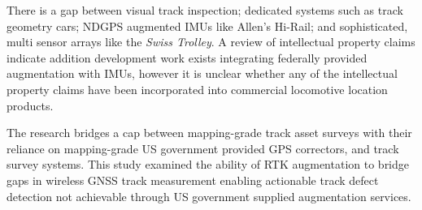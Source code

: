 There is a gap between visual track inspection; dedicated systems such as track geometry cars; NDGPS augmented IMUs like Allen's Hi-Rail; and sophisticated, multi sensor arrays like the \emph{Swiss Trolley}. A review of intellectual property claims indicate addition development work exists integrating federally provided augmentation with IMUs, however it is unclear whether any of the intellectual property claims have been incorporated into commercial locomotive location products.

The research bridges a cap between mapping-grade track asset surveys with their reliance on mapping-grade US government provided GPS correctors, and track survey systems. This study examined the ability of RTK augmentation to bridge gaps in wireless GNSS track measurement enabling actionable track defect detection not achievable through US government supplied augmentation services.
